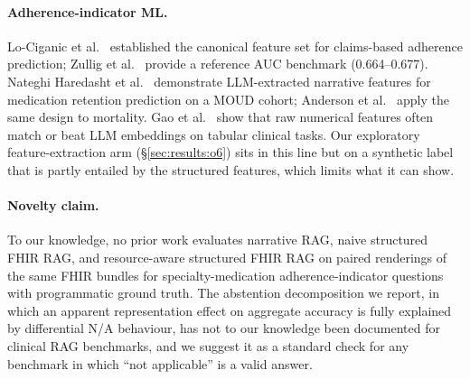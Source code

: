 \paragraph{Adherence-indicator ML.}
Lo-Ciganic et al.~\citep{lociganic2015using} established the canonical feature set for
claims-based adherence prediction; Zullig et al.~\citep{zullig2019novel} provide a
reference AUC benchmark (0.664--0.677).  Nateghi Haredasht et al.~\citep{nateghi2025predicting}
demonstrate LLM-extracted narrative features for medication retention prediction on a MOUD
cohort; Anderson et al.~\citep{anderson2025paging} apply the same design to mortality.
Gao et al.~\citep{gao2024raw} show that raw numerical features often match or beat LLM
embeddings on tabular clinical tasks.  Our exploratory feature-extraction arm
(\S\ref{sec:results:o6}) sits in this line but on a synthetic label that is partly entailed
by the structured features, which limits what it can show.

\paragraph{Novelty claim.}
To our knowledge, no prior work evaluates narrative RAG, naive structured FHIR RAG, and
resource-aware structured FHIR RAG on paired renderings of the same FHIR bundles for
specialty-medication adherence-indicator questions with programmatic ground truth.  The
abstention decomposition we report, in which an apparent representation effect on
aggregate accuracy is fully explained by differential N/A behaviour, has not to our
knowledge been documented for clinical RAG benchmarks, and we suggest it as a standard
check for any benchmark in which ``not applicable'' is a valid answer.
